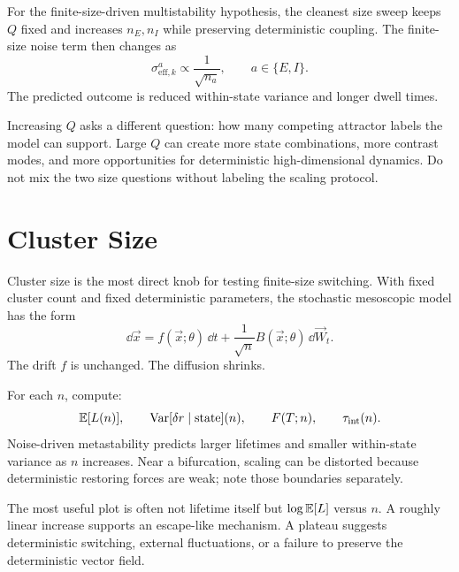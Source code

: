 For the finite-size-driven multistability hypothesis, the cleanest size sweep keeps $Q$ fixed and increases $n_E,n_I$ while preserving deterministic coupling. The finite-size noise term then changes as
%
\begin{equation}
  \sigma_{\mathrm{eff},k}^{a}
  \propto
  \frac{1}{\sqrt{n_a}},
  \qquad
  a\in\{E,I\}.
  \label{eq:size-noise-scaling-ei}
\end{equation}
%
The predicted outcome is reduced within-state variance and longer dwell times.

Increasing $Q$ asks a different question: how many competing attractor labels the model can support. Large $Q$ can create more state combinations, more contrast modes, and more opportunities for deterministic high-dimensional dynamics. Do not mix the two size questions without labeling the scaling protocol.

\section{Cluster Size}
\label{sec:phase-cluster-size}

Cluster size is the most direct knob for testing finite-size switching. With fixed cluster count and fixed deterministic parameters, the stochastic mesoscopic model has the form
%
\begin{equation}
  \dd \vec x
  =
  f(\vec x;\theta)\,\dd t
  +
  \frac{1}{\sqrt n}B(\vec x;\theta)\,\dd \vec W_t .
  \label{eq:cluster-size-phase-sde}
\end{equation}
%
The drift $f$ is unchanged. The diffusion shrinks.

For each $n$, compute:
%
\begin{equation}
  \mathbb{E}[L(n)],
  \qquad
  \operatorname{Var}[\delta r\mid \text{state}](n),
  \qquad
  F(T;n),
  \qquad
  \tau_{\mathrm{int}}(n).
  \label{eq:cluster-size-summary-statistics}
\end{equation}
%
Noise-driven metastability predicts larger lifetimes and smaller within-state variance as $n$ increases. Near a bifurcation, scaling can be distorted because deterministic restoring forces are weak; note those boundaries separately.

The most useful plot is often not lifetime itself but $\log \mathbb{E}[L]$ versus $n$. A roughly linear increase supports an escape-like mechanism. A plateau suggests deterministic switching, external fluctuations, or a failure to preserve the deterministic vector field.

